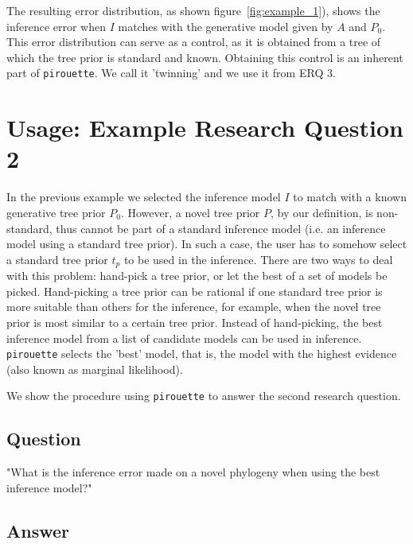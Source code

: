 \documentclass{article}
\begin{document}
The resulting error distribution, as shown figure~\ref{fig:example_1}),
shows the inference error 
when $\mathit{I}$ matches with the generative model given 
by $\mathit{A}$ and $\mathit{P_{0}}$.
This error distribution can serve as a control,
as it is obtained from a tree of which the tree prior is standard and known.
Obtaining this control is an inherent part of \verb;pirouette;. 
We call it 'twinning' and we use it from ERQ 3.

\section{Usage: Example Research Question 2}

In the previous example we selected the inference model $\mathit{I}$ to match 
with a known generative tree prior $\mathit{P_{0}}$.
However, a novel tree prior $\mathit{P}$, by our definition, is non-standard, 
thus cannot be part of a standard inference 
model (i.e. an inference model using a standard tree prior).
In such a case, the user has to somehow select 
a standard tree prior $\mathit{t_{p}}$ to be 
used in the inference.
There are two ways to deal with this problem: hand-pick a tree
prior, or let the best of a set of models be picked. 
Hand-picking a tree prior can be rational if one standard tree prior 
is more suitable than others for the inference, for example, when
the novel tree prior is most similar to a certain tree prior.
Instead of hand-picking, the best inference model from a list of candidate 
models can be used in inference.
\verb;pirouette; selects the 'best' model, that is, 
the model with the highest evidence (also known as marginal likelihood). 

We show the procedure using \verb;pirouette; to answer the second research 
question.

\subsection{Question}

"What is the inference error made on a novel phylogeny when
using the best inference model?"

\subsection{Answer}
\end{document}
